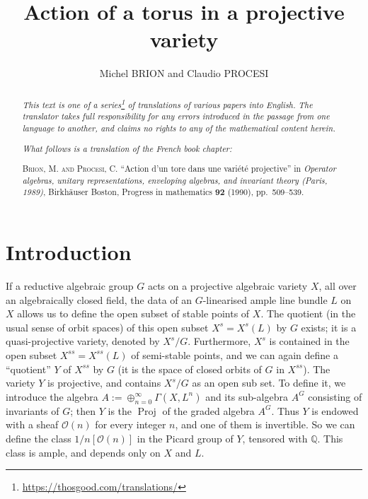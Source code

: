 \documentclass{article}
\title{Action of a torus in a projective variety}
\author{Michel BRION and Claudio PROCESI}
\date{}
\newcommand{\sh}{\mathscr}
\DeclareMathOperator{\Proj}{Proj}
\begin{document}
\maketitle
\thispagestyle{fancy}

\renewcommand{\abstractname}{Translator's note.}

\begin{abstract}
  \renewcommand*{\thefootnote}{\fnsymbol{footnote}}
  \emph{This text is one of a series\footnote{\url{https://thosgood.com/translations/}} of translations of various papers into English.}
  \emph{The translator takes full responsibility for any errors introduced in the passage from one language to another, and claims no rights to any of the mathematical content herein.}
  
  \emph{What follows is a translation of the French book chapter:}

  \medskip\noindent
  \textsc{Brion, M. and Procesi, C.}
  ``Action d'un tore dans une vari\'{e}t\'{e} projective''
  in \emph{Operator algebras, unitary representations, enveloping algebras, and invariant theory (Paris, 1989)}, Birkhäuser Boston, Progress in mathematics \textbf{92} (1990), pp.~509--539.
\end{abstract}

\setcounter{footnote}{0}

\tableofcontents
\bigskip



\section*{Introduction}
\label{section:introduction}

If a reductive algebraic group $G$ acts on a projective algebraic variety $X$, all over an algebraically closed field, the data of an $G$-linearised ample line bundle $L$ on $X$ allows us to define the open subset of stable points of $X$.
The quotient (in the usual sense of orbit spaces) of this open subset $X^s=X^s(L)$ by $G$ exists;
it is a quasi-projective variety, denoted by $X^s/G$.
Furthermore, $X^s$ is contained in the open subset $X^{ss}=X^{ss}(L)$ of semi-stable points, and we can again define a ``quotient'' $Y$ of $X^{ss}$ by $G$ (it is the space of closed orbits of $G$ in $X^{ss}$).
The variety $Y$ is projective, and contains $X^s/G$ as an open sub set.
To define it, we introduce the algebra $A:=\oplus_{n=0}^\infty \Gamma(X,L^n)$ and its sub-algebra $A^G$ consisting of invariants of $G$;
then $Y$ is the $\Proj$ of the graded algebra $A^G$.
Thus $Y$ is endowed with a sheaf $\sh{O}(n)$ for every integer $n$, and one of them is invertible.
So we can define the class $1/n[\sh{O}(n)]$ in the Picard group of $Y$, tensored with $\mathbb{Q}$.
This class is ample, and depends only on $X$ and $L$.
\end{document}
